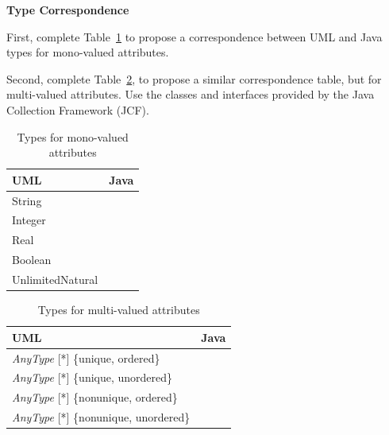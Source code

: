 \documentclass[a4paper,11pt]{memoir}
\begin{document}
\begin{question}\textbf{Type Correspondence}

\begin{inparaenum}[(A)]
	\item First, complete Table~\ref{tab:monovalued} to propose a correspondence between UML and Java types for mono-valued attributes.
	\item Second, complete Table~\ref{tab:multivalued}, to propose a similar correspondence table, but for multi-valued attributes. Use the classes and interfaces provided by the Java Collection Framework (JCF).
\end{inparaenum}

\begin{table}
	\begin{center}
		\begin{tabular}{p{5cm}p{5cm}}
			\toprule
			\textbf{UML} & \textbf{Java}\\
			\midrule
String   & \\
Integer  & \\
Real 	  & \\
Boolean  & \\
UnlimitedNatural & \\
			\bottomrule
		\end{tabular}
	\end{center}
	\caption{Types for mono-valued attributes}
	\label{tab:monovalued}
\end{table}



\begin{table}
	\begin{center}
		\begin{tabular}{p{7cm}p{5cm}}
			\toprule
			\textbf{UML} & \textbf{Java}\\
			\midrule
			             \emph{AnyType} [*] \{unique, ordered\}  & \\
			              \emph{AnyType} [*] \{unique, unordered\}   & \\
			              \emph{AnyType} [*] \{nonunique, ordered\}  	  & \\
						  \emph{AnyType} [*] \{nonunique, unordered\}   & \\
			\bottomrule
		\end{tabular}
			\end{center}
			\caption{Types for multi-valued attributes}
			\label{tab:multivalued}
		\end{table}
\end{question}
\end{document}
